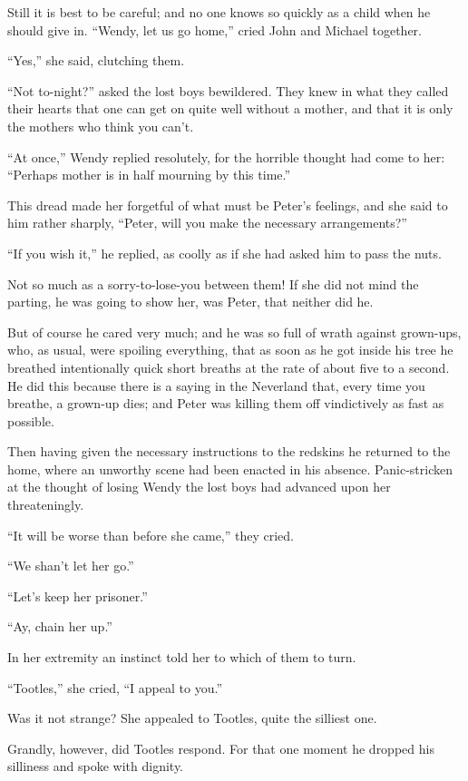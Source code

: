 Still it is best to be careful; and no one knows so quickly as a child
when he should give in. ``Wendy, let us go home,'' cried John and Michael
together.

``Yes,'' she said, clutching them.

``Not to-night?'' asked the lost boys bewildered. They knew in what they
called their hearts that one can get on quite well without a mother,
and that it is only the mothers who think you can't.

``At once,'' Wendy replied resolutely, for the horrible thought had come
to her: ``Perhaps mother is in half mourning by this time.''

This dread made her forgetful of what must be Peter's feelings, and she
said to him rather sharply, ``Peter, will you make the necessary
arrangements?''

``If you wish it,'' he replied, as coolly as if she had asked him to pass
the nuts.

Not so much as a sorry-to-lose-you between them! If she did not mind
the parting, he was going to show her, was Peter, that neither did he.

But of course he cared very much; and he was so full of wrath against
grown-ups, who, as usual, were spoiling everything, that as soon as he
got inside his tree he breathed intentionally quick short breaths at
the rate of about five to a second. He did this because there is a
saying in the Neverland that, every time you breathe, a grown-up dies;
and Peter was killing them off vindictively as fast as possible.

Then having given the necessary instructions to the redskins he
returned to the home, where an unworthy scene had been enacted in his
absence. Panic-stricken at the thought of losing Wendy the lost boys
had advanced upon her threateningly.

``It will be worse than before she came,'' they cried.

``We shan't let her go.''

``Let's keep her prisoner.''

``Ay, chain her up.''

In her extremity an instinct told her to which of them to turn.

``Tootles,'' she cried, ``I appeal to you.''

Was it not strange? She appealed to Tootles, quite the silliest one.

Grandly, however, did Tootles respond. For that one moment he dropped
his silliness and spoke with dignity.

